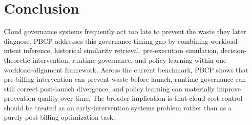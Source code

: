 \section{Conclusion}


Cloud governance systems frequently act too late to prevent the waste they later
diagnose. PBCP addresses this governance-timing gap by combining workload-intent
inference, historical similarity retrieval, pre-execution simulation,
decision-theoretic intervention, runtime governance, and policy learning within
one workload-alignment framework. Across the current benchmark, PBCP shows that
pre-billing intervention can prevent waste before launch, runtime governance can
still correct post-launch divergence, and policy learning can materially improve
prevention quality over time. The broader implication is that cloud cost control
should be treated as an early-intervention systems problem rather than as a
purely post-billing optimization task.
